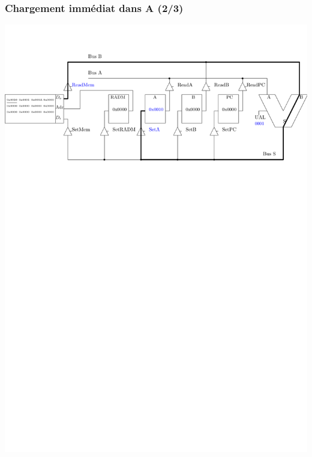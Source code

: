 \documentclass{beamer}
\begin{document}
\begin{frame}
\frametitle{Chargement immédiat dans A (2/3)}
\centering\includegraphics[width=\linewidth]{Figs/premier_chemin_lda_2.pdf}
\end{frame}
\end{document}
